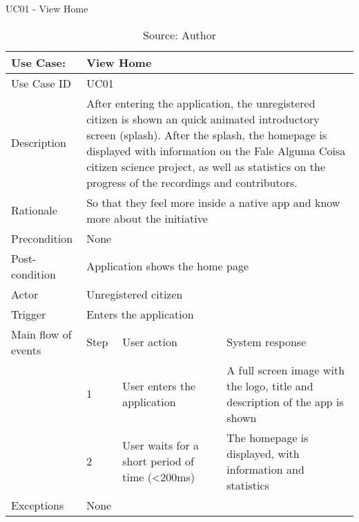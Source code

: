 \begin{table}[ht]
\centering
\caption{UC01 - View Home}
\label{uc:01}
\begin{tabular}{|p{3cm}|p{1cm}|p{5cm}|p{5cm}|}
\hline
Use Case:       & \multicolumn{3}{p{11cm}|}{View Home} \\ \hline
Use Case ID     & \multicolumn{3}{p{11cm}|}{UC01} \\ \hline
Description     & \multicolumn{3}{p{11cm}|}{After entering the application, the unregistered citizen is shown an quick animated introductory screen (splash). After the splash, the homepage is displayed with information on the Fale Alguma Coisa citizen science project, as well as statistics on the progress of the recordings and contributors.} \\ \hline
Rationale       & \multicolumn{3}{p{11cm}|}{So that they feel more inside a native app and know more about the initiative} \\ \hline
Precondition    & \multicolumn{3}{p{11cm}|}{None} \\ \hline
Post-condition  & \multicolumn{3}{p{11cm}|}{Application shows the home page} \\ \hline
Actor           & \multicolumn{3}{p{11cm}|}{Unregistered citizen} \\ \hline
Trigger         & \multicolumn{3}{p{11cm}|}{Enters the application} \\ \hline
Main flow of events & Step  & User action & System response \\ \hline
                    & 1     & User enters the application & A full screen image with the logo, title and description of the app is shown \\ \hline
                    & 2     & User waits for a short period of time (<200ms) & The homepage is displayed, with information and statistics \\ \hline
Exceptions      & \multicolumn{3}{p{11cm}|}{None} \\ \hline
\end{tabular}
\caption*{Source: Author}
\end{table}

